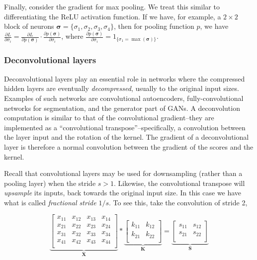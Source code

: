 \documentclass[11pt]{amsart}
\begin{document}
Finally, consider the gradient for max pooling. We treat this similar to differentiating the ReLU activation function. If we have, for example, a $2 \times 2$ block of neurons $\boldsymbol\sigma=\{\sigma_1, \sigma_2, \sigma_3, \sigma_4\}$, then for pooling function $p$, we have $\frac{\partial{L}}{\partial{\sigma_i}} = \frac{\partial{L}}{\partial{p(\boldsymbol\sigma)}}\cdot\frac{\partial{p(\boldsymbol\sigma)}}{\partial{\sigma_i}}$, where $\frac{\partial{p(\boldsymbol\sigma)}}{\partial{\sigma_i}} = 1_{\{\sigma_1 = \max(\boldsymbol\sigma)\}}$.

\subsubsection{Deconvolutional layers}

Deconvolutional layers play an essential role in networks where the compressed hidden layers are eventually \emph{decompressed}, usually to the original input sizes. Examples of such networks are convolutional autoencoders, fully-convolutional networks for segmentation, and the generator part of GANs. A deconvolution computation is similar to that of the convolutional gradient--they are implemented as a ``convolutional transpose''--specifically, a convolution between the layer input and the rotation of the kernel. The gradient of a deconvolutional layer is therefore a normal convolution between the gradient of the scores and the kernel.

Recall that convolutional layers may be used for downsampling (rather than a pooling layer) when the stride $s > 1$. Likewise, the convolutional transpose will \emph{upsample} its inputs, back towards the original input size. In this case we have what is called \emph{fractional stride} $1/s$. To see this, take the convolution of stride 2,

$$
\underbrace{\begin{bmatrix}
x_{11} & x_{12} & x_{13} & x_{14} \\
x_{21} & x_{22} & x_{23} & x_{24} \\
x_{31} & x_{32} & x_{33} & x_{34} \\
x_{41} & x_{42} & x_{43} & x_{44} \\
\end{bmatrix}}_{\mathbf{X}} * 
\underbrace{\begin{bmatrix}
k_{11} & k_{12} \\
k_{21} & k_{22} \\
\end{bmatrix}}_{\mathbf{K}} =
\underbrace{\begin{bmatrix}
s_{11} & s_{12} \\
s_{21} & s_{22} \\
\end{bmatrix}}_{\mathbf{S}}
$$
\end{document}
